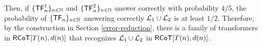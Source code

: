 Then, if $\{\mathsf{TF}^1_n\}_{n \in \mathbb{N}}$ and $\{\mathsf{TF}^2_n\}_{n \in \mathbb{N}}$ answer correctly with probability $4/5$, the probability of $\{\mathsf{TF}_n\}_{n \in \mathbb{N}}$ answering correctly $\mathcal{L}_1 \cup \mathcal{L}_2$ is at least $1/2$.
Therefore, by the construction in Section \ref{error-reduction}, there is a family of transformers in $\mathsf{RCoT}[T(n), d(n)]$ that recognizes $\mathcal{L}_1 \cup \mathcal{L}_2$ in $\mathsf{RCoT}[T(n), d(n)]$.
